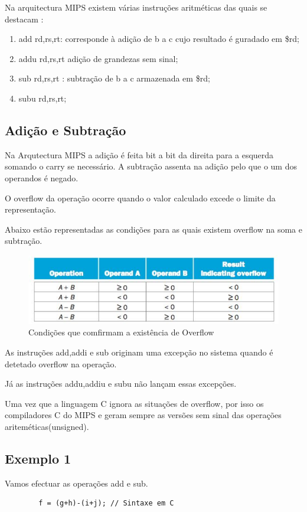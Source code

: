 \documentclass[10pt,a4paper]{book}
\begin{document}
	  Na arquitectura MIPS existem várias instruções aritméticas das quais se destacam :
	    \begin{enumerate}
	     \item add rd,rs,rt: corresponde à adição de b a c cujo resultado é guradado em \$rd;
	     \item addu rd,rs,rt adição de grandezas sem sinal;
	     \item sub rd,rs,rt : subtração de b a c armazenada em \$rd;
	     \item subu rd,rs,rt;
	    \end{enumerate}

	    \subsection{Adição e Subtração}
	    	Na Arqutectura MIPS a adição é feita bit a bit da direita para a esquerda somando o carry se necessário. A subtração assenta na adição pelo que o um dos operandos é negado.

	    	O overflow da operação ocorre quando o valor calculado excede o limite da representação.

	    	Abaixo estão representadas as condições para as quais existem overflow na soma e subtração.


			\begin{figure}[htp]
			    \centering
			    \includegraphics[scale=0.4]{of.png}
			    \caption{Condições que comfirmam a existência de Overflow}
			    \label{OF}
			\end{figure}

			As instruções add,addi e sub originam uma excepção no sistema quando é detetado overflow na operação.

			Já as instruções addu,addiu e subu não lançam essas excepções.

			Uma vez que a linguagem C ignora as situações de overflow, por isso os compiladores C do MIPS e geram sempre as versões sem sinal das operações ariteméticas(unsigned).

	    \subsection{Exemplo 1}
	     Vamos efectuar as operações add e sub.
	      \begin{lstlisting}
		f = (g+h)-(i+j); // Sintaxe em C
	      \end{lstlisting}
\end{document}
